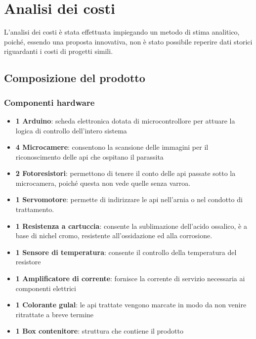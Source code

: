 \section{Analisi dei costi}
L'analisi dei costi è stata effettuata impiegando un metodo di stima analitico,
poiché, essendo una proposta innovativa, non è stato possibile reperire dati
storici riguardanti i costi di progetti simili.
\subsection{Composizione del prodotto}
\subsubsection{Componenti hardware}
\begin{itemize}
\item \textbf{1 Arduino}: scheda elettronica dotata di microcontrollore per
attuare la logica di controllo dell’intero sistema
\item \textbf{4 Microcamere}: consentono la scansione delle immagini per il
riconoscimento delle api che ospitano il parassita
\item \textbf{2 Fotoresistori}: permettono di tenere il conto delle api passate
sotto la microcamera, poiché questa non vede quelle senza varroa.
\item \textbf{1 Servomotore}: permette di indirizzare le api nell’arnia o nel
condotto di trattamento.
\item \textbf{1 Resistenza a cartuccia}: consente la sublimazione dell’acido
ossalico, è a base di nichel cromo, resistente all’ossidazione ed alla
corrosione.
\item \textbf{1 Sensore di temperatura}: consente il controllo della temperatura
del resistore
\item \textbf{1 Amplificatore di corrente}: fornisce la corrente di servizio
necessaria ai componenti elettrici
\item \textbf{1 Colorante gulal}: le api trattate vengono marcate in modo da non
venire ritrattate a breve termine
\item \textbf{1 Box contenitore}: struttura che contiene il prodotto
\end{itemize}
